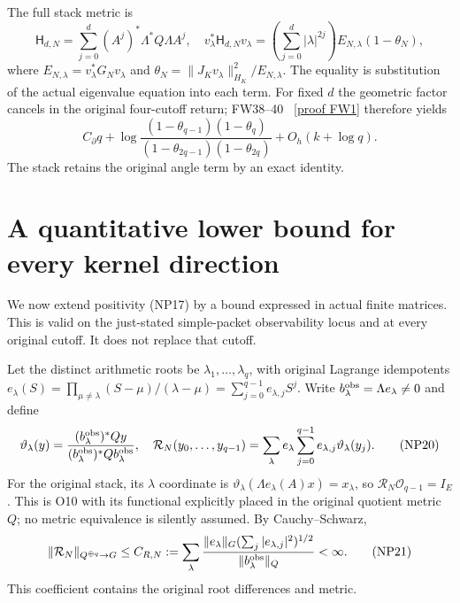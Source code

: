 \documentclass[11pt]{article}
\begin{document}
The full stack metric is
\[
 \mathsf H_{d,N}=\sum_{j=0}^d(A^j)^*\Lambda^*Q\Lambda A^j,
 \quad v_\lambda^*\mathsf H_{d,N}v_\lambda
  =\left(\sum_{j=0}^d|\lambda|^{2j}\right)E_{N,\lambda}(1-\theta_N),
 \tag{NP18}
\]
where $E_{N,\lambda}=v_\lambda^*G_Nv_\lambda$ and
$\theta_N=\|J_Kv_\lambda\|_{H_K}^2/E_{N,\lambda}$.
The equality is substitution of the actual eigenvalue equation into
each term. For fixed $d$ the geometric factor cancels in the original
four-cutoff return; FW38--40 \cite{FW}%
~\href{https://github.com/KokunoYumeto/zeta-function-research-reader/blob/5992ad50c0f2a06921f1fcaded7b4e38097c0739/workbenches/splitzero-tandem/continuations/20260920-original-kernel-mixed-determinants/providers/FULL_WINDOW_SOURCE_PRODUCTS.tex\#L28}{[proof FW1]}%
{} therefore yields
\[
 C_\partial q+
 \log\frac{(1-\theta_{q-1})(1-\theta_q)}
               {(1-\theta_{2q-1})(1-\theta_{2q})}
       +O_h(k+\log q). \tag{NP19}
\]
The stack retains the original angle term by an exact identity.

\section{A quantitative lower bound for every kernel direction}
We now extend positivity (NP17) by a bound expressed in actual finite
matrices. This is valid on the just-stated simple-packet observability
locus and at every original cutoff. It does not replace that cutoff.

Let the distinct arithmetic roots be $\lambda_1,\ldots,\lambda_q$,
with original Lagrange idempotents
$e_\lambda(S)=\prod_{\mu\ne\lambda}(S-\mu)/(\lambda-\mu)
=\sum_{j=0}^{q-1}e_{\lambda,j}S^j$. Write
$b_\lambda^{\rm obs}=\Lambda e_\lambda\ne0$ and define
\[
 \vartheta_\lambda(y)=
 \frac{(b_\lambda^{\rm obs})^*Qy}{
             (b_\lambda^{\rm obs})^*Qb_\lambda^{\rm obs}},
 \quad\mathcal R_N(y_0,\ldots,y_{q-1})
 =\sum_\lambda e_\lambda\sum_{j=0}^{q-1}e_{\lambda,j}
                                      \vartheta_\lambda(y_j).
 \tag{NP20}
\]
For the original stack, its $\lambda$ coordinate is
$\vartheta_\lambda(\Lambda e_\lambda(A)x)=x_\lambda$, so
$\mathcal R_N\mathcal O_{q-1}=I_E$. This is O10 with its
functional explicitly placed in the original quotient metric $Q$;
no metric equivalence is silently assumed. By Cauchy--Schwarz,
\[
 \|\mathcal R_N\|_{Q^{\oplus q}\to G}\le C_{R,N}:=
 \sum_\lambda\frac{\|e_\lambda\|_G
                 (\sum_j|e_{\lambda,j}|^2)^{1/2}}
                        {\|b_\lambda^{\rm obs}\|_Q}<\infty.
 \tag{NP21}
\]
This coefficient contains the original root differences and metric.
\end{document}
